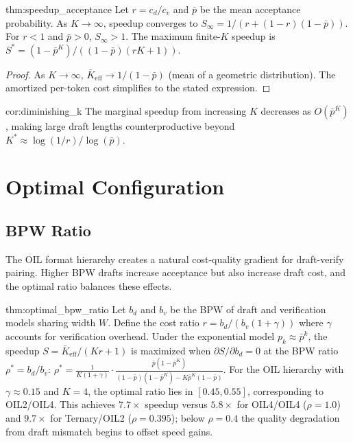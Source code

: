 \begin{mythm}{thm:speedup_acceptance}
Let $r = c_d/c_v$ and $\bar{p}$ be the mean acceptance probability.
As $K \to \infty$, speedup converges to
$S_{\infty} = 1 / (r + (1-r)(1-\bar{p}))$.
For $r < 1$ and $\bar{p} > 0$, $S_{\infty} > 1$. The maximum
finite-$K$ speedup is $S^* = (1-\bar{p}^K)/((1-\bar{p})(rK+1))$.
\end{mythm}

\begin{proof}
As $K \to \infty$, $\bar{K}_{\text{eff}} \to 1/(1-\bar{p})$ (mean of a
geometric distribution). The amortized per-token cost simplifies to
the stated expression.
\end{proof}

\begin{mycor}{cor:diminishing_k}
The marginal speedup from increasing $K$ decreases as $O(\bar{p}^K)$,
making large draft lengths counterproductive beyond
$K^* \approx \log(1/r)/\log(\bar{p})$.
\end{mycor}

\section{Optimal Configuration}
\label{sec:optimal_config}

\subsection{BPW Ratio}

The OIL format hierarchy creates a natural cost-quality gradient for
draft-verify pairing. Higher BPW drafts increase acceptance but also
increase draft cost, and the optimal ratio balances these effects.

\begin{mythm}{thm:optimal_bpw_ratio}
Let $b_d$ and $b_v$ be the BPW of draft and verification models
sharing width $W$. Define the cost ratio $r = b_d/(b_v(1+\gamma))$
where $\gamma$ accounts for verification overhead. Under the
exponential model $p_k \approx \bar{p}^k$, the speedup
$S = \bar{K}_{\text{eff}}/(Kr+1)$ is maximized when
$\partial S/\partial b_d = 0$ at the BPW ratio $\rho^* = b_d/b_v$:
$\rho^* = \frac{1}{K(1+\gamma)}\cdot
\frac{\bar{p}(1-\bar{p}^K)}
{(1-\bar{p})(1-\bar{p}^K)-K\bar{p}^K(1-\bar{p})}$.
For the OIL hierarchy with $\gamma \approx 0.15$ and $K=4$, the
optimal ratio lies in $[0.45,0.55]$, corresponding to OIL2/OIL4.
This achieves $7.7\times$ speedup versus $5.8\times$ for OIL4/OIL4
($\rho=1.0$) and $9.7\times$ for Ternary/OIL2 ($\rho=0.395$); below
$\rho=0.4$ the quality degradation from draft mismatch begins to
offset speed gains.
\end{mythm}


